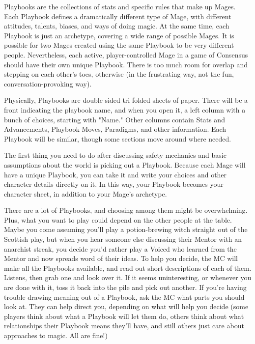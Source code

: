 \documentclass[
  oneside,
  statementpaper,
  9pt]{memoir}
\begin{document}
\begin{Player}

Playbooks are the collections of stats and specific rules that make up Mages. Each Playbook defines a dramatically different type of Mage, with different attitudes, talents, biases, and ways of doing magic. At the same time, each Playbook is just an archetype, covering a wide range of possible Mages. It is possible for two Mages created using the same Playbook to be very different people. Nevertheless, each active, player-controlled Mage in a game of Consensus should have their own unique Playbook. There is too much room for overlap and stepping on each other's toes, otherwise (in the frustrating way, not the fun, conversation-provoking way).

Physically, Playbooks are double-sided tri-folded sheets of paper. There will be a front indicating the playbook name, and when you open it, a left column with a bunch of choices, starting with "Name." Other columns contain Stats and Advancements, Playbook Moves, Paradigms, and other information. Each Playbook will be similar, though some sections move around where needed.

The first thing you need to do after discussing safety mechanics and basic assumptions about the world is picking out a Playbook. Because each Mage will have a unique Playbook, you can take it and write your choices and other character details directly on it. In this way, your Playbook becomes your character sheet, in addition to your Mage's archetype.

There are a lot of Playbooks, and choosing among them might be overwhelming. Plus, what you want to play could depend on the other people at the table. Maybe you come assuming you'll play a potion-brewing witch straight out of the Scottish play, but when you hear someone else discussing their Mentor with an anarchist streak, you decide you'd rather play a Voiced who learned from the Mentor and now spreads word of their ideas. To help you decide, the MC will make all the Playbooks available, and read out short descriptions of each of them. Listens, then grab one and look over it. If it seems uninteresting, or whenever you are done with it, toss it back into the pile and pick out another. If you're having trouble drawing meaning out of a Playbook, ask the MC what parts you should look at. They can help direct you, depending on what will help you decide (some players think about what a Playbook will let them do, others think about what relationships their Playbook means they'll have, and still others just care about approaches to magic. All are fine!)


\end{Player}
\end{document}
